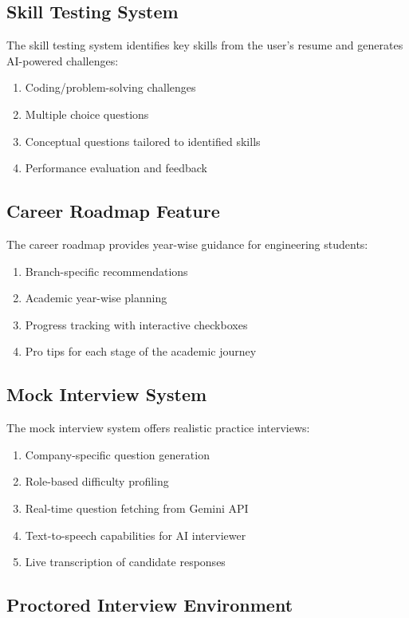\documentclass[12pt, conference]{IEEEtran}
\begin{document}
\subsection{Skill Testing System}

The skill testing system identifies key skills from the user's resume and generates AI-powered challenges:
\begin{enumerate}
    \item Coding/problem-solving challenges
    \item Multiple choice questions
    \item Conceptual questions tailored to identified skills
    \item Performance evaluation and feedback
\end{enumerate}

\subsection{Career Roadmap Feature}

The career roadmap provides year-wise guidance for engineering students:
\begin{enumerate}
    \item Branch-specific recommendations
    \item Academic year-wise planning
    \item Progress tracking with interactive checkboxes
    \item Pro tips for each stage of the academic journey
\end{enumerate}

\subsection{Mock Interview System}

The mock interview system offers realistic practice interviews:
\begin{enumerate}
    \item Company-specific question generation
    \item Role-based difficulty profiling
    \item Real-time question fetching from Gemini API
    \item Text-to-speech capabilities for AI interviewer
    \item Live transcription of candidate responses
\end{enumerate}

\subsection{Proctored Interview Environment}
\end{document}
